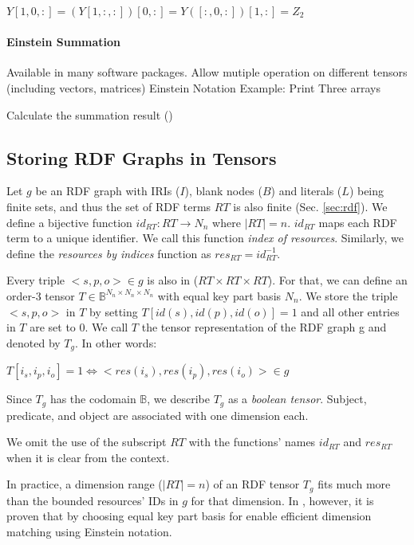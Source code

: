 \centerline{$Y[1, 0, :] = (Y[1, :, :])[0, :] = Y([:, 0, :])[1, :] = Z_2$}

\paragraph{Einstein Summation}
\label{einstein_summation}
Available in many software packages.
Allow mutiple operation on different tensors (including vectors, matrices)
Einstein Notation Example:
Print Three arrays

Calculate the summation result ()

\subsection{Storing RDF Graphs in Tensors}
\label{sec:rdf_tensor}
Let $g$ be an RDF graph with IRIs ($I$), blank nodes ($B$) and literals ($L$) being finite sets, and thus the set of RDF terms $RT$ is also finite (Sec. \ref{sec:rdf}). We define a bijective function $id_{RT}: RT \to N_n$ where $|RT|=n$. $id_{RT}$ maps each RDF term to a unique identifier. We call this function \textit{index of resources}.  Similarly, we define the \textit{resources by indices} function as $res_{RT} = id_{RT}^{-1}$. 



Every triple $<s, p, o> \in g$ is also in ($RT \times RT \times RT$). For that, we can define an order-3 tensor $T \in \mathbb{B}^{N_n \times N_n \times N_n}$ with equal key part basis $N_n$. We store the triple $<s, p, o>$ in $T$ by setting $T[id(s), id(p), id(o)] = 1$ and all other entries in $T$ are set to 0. We call $T$ the tensor representation of the RDF graph g and denoted by $T_g$. In other words: \\
\centerline{$T[i_s, i_p, i_o] = 1 \iff <res(i_s), res(i_p), res(i_o)> \in g$}

Since $T_g$ has the codomain $\mathbb{B}$, we describe $T_g$ as a \textit{boolean tensor}. Subject, predicate, and object are associated with one dimension each. 

\begin{remark}
	We omit the use of the subscript $RT$ with the functions' names $id_{RT}$ and $res_{RT}$ when it is clear from the context. 
\end{remark}

\begin{remark}
	In practice, a dimension range  ($|RT| =n$) of an RDF tensor $T_g$ fits much more than the bounded resources' IDs in $g$ for that dimension. In \cite{tentris2020}, however, it is proven that by choosing equal key part basis for enable efficient dimension matching using Einstein notation.
\end{remark}

